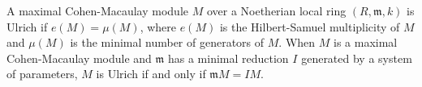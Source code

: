 \documentclass[12pt]{article}
\begin{document}
A maximal Cohen-Macaulay module $M$ over a Noetherian local ring $(R,\mathfrak{m},k)$ is Ulrich if $e(M)=\mu(M)$, where $e(M)$ is the Hilbert-Samuel multiplicity of $M$ and $\mu(M)$ is the minimal number of generators of $M$. When $M$ is a maximal Cohen-Macaulay module and $\mathfrak{m}$ has a minimal reduction $I$ generated by a system of parameters, $M$ is Ulrich if and only if $\mathfrak{m}M=IM$.
\end{document}
